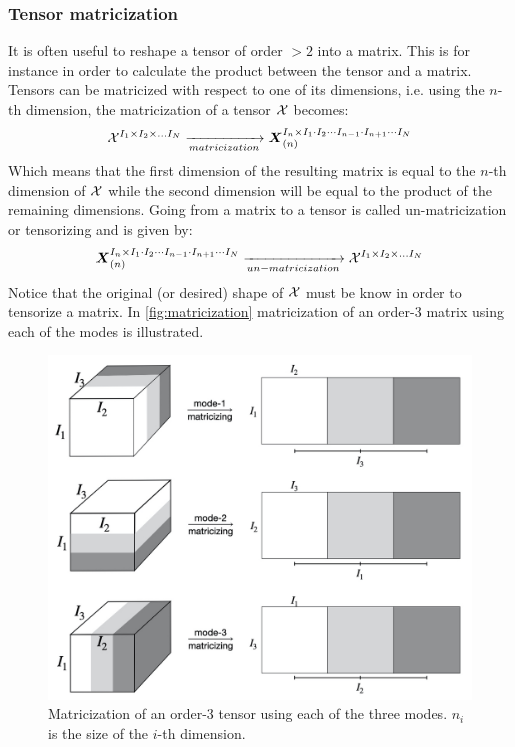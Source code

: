 \subsubsection{Tensor matricization}
It is often useful to reshape a tensor of order $> 2$ into a matrix. This is for instance in order to calculate the product between the tensor and a matrix. Tensors can be matricized with respect to one of its dimensions, i.e. using the $n$-th dimension, the matricization of a tensor $\mathcal{X}$ becomes:
\begin{equation}
    \mathcal{X}^{I_1 \times I_2 \times \dots I_N} \xrightarrow[matricization]{} \boldsymbol{X}_{(n)}^{I_n \times I_1 \cdot I_2 \cdots I_{n-1} \cdot I_{n+1} \cdots I_N}
\end{equation}
Which means that the first dimension of the resulting matrix is equal to the $n$-th dimension of $\mathcal{X}$ while the second dimension will be equal to the product of the remaining dimensions. Going from a matrix to a tensor is called un-matricization or tensorizing and is given by:
\begin{equation}
      \boldsymbol{X}_{(n)}^{I_n \times I_1 \cdot I_2 \cdots I_{n-1} \cdot I_{n+1} \cdots I_N} \xrightarrow[un-matricization]{} \mathcal{X}^{I_1 \times I_2 \times \dots I_N}
\end{equation}
Notice that the original (or desired) shape of $\mathcal{X}$ must be know in order to tensorize a matrix. In \autoref{fig:matricization} matricization of an order-3 matrix using each of the modes is illustrated.
\begin{figure}
    \centering
    \captionsetup{width=.6\linewidth}
    \includegraphics[width=.6\linewidth]{Pics/02_Theory/matricization.jpeg}
    \caption{Matricization of an order-3 tensor using each of the three modes. $n_i$ is the size of the $i$-th dimension.}
    \label{fig:matricization}
\end{figure}

